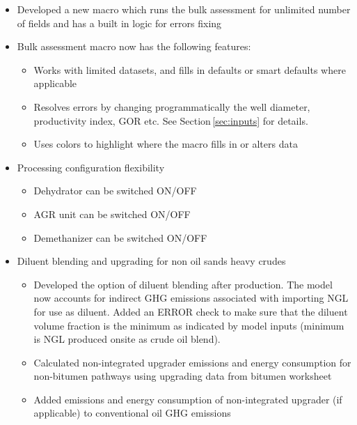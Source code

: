 \documentclass[11pt]{report}
\begin{document}
\begin{itemize}
\item{Developed a new macro which runs the bulk assessment for unlimited number of fields and has a built in logic for errors fixing}
\item{Bulk assessment macro now has the following features:}
\begin{itemize}
\item{Works with limited datasets, and fills in defaults or smart defaults where applicable}
\item{Resolves errors by changing programmatically the well diameter, productivity index, GOR etc. See Section\,\ref{sec:inputs} for details.}
\item{Uses colors to highlight where the macro fills in or alters data}
\end{itemize}
\item{Processing configuration flexibility}
\begin{itemize}
\item{Dehydrator can be switched ON/OFF}
\item{AGR unit can be switched ON/OFF}
\item{Demethanizer can be switched ON/OFF}
\end{itemize}
\item{Diluent blending and upgrading for non oil sands heavy crudes}
\begin{itemize}
\item{Developed the option of diluent blending after production. The model now accounts for indirect GHG emissions associated with importing NGL for use as diluent. Added an ERROR check to make sure that the diluent volume fraction is the minimum as indicated by model inputs (minimum is NGL produced onsite as crude oil blend).}
\item{Calculated non-integrated upgrader emissions and energy consumption for non-bitumen pathways using upgrading data from bitumen worksheet }
\item{Added emissions and energy consumption of non-integrated upgrader (if applicable) to conventional oil GHG emissions}
\end{itemize}
\end{itemize}
\end{document}
